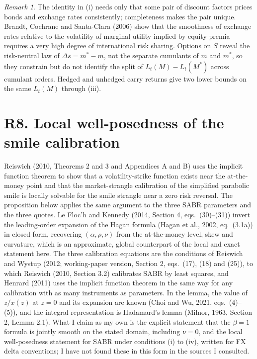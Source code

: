 \documentclass[11pt]{article}
\theoremstyle{remark}
\newtheorem{remark}[proposition]{Remark}
\begin{document}
\begin{remark}
The identity in (i) needs only that some pair of discount factors prices bonds and exchange rates consistently; completeness makes the pair unique. Brandt, Cochrane and Santa-Clara (2006) show that the smoothness of exchange rates relative to the volatility of marginal utility implied by equity premia requires a very high degree of international risk sharing. Options on $S$ reveal the risk-neutral law of $\Delta s=m^*-m$, not the separate cumulants of $m$ and $m^*$, so they constrain but do not identify the split of $L_t(M)-L_t(M^*)$ across cumulant orders. Hedged and unhedged carry returns give two lower bounds on the same $L_t(M)$ through (iii).
\end{remark}

\section*{R8. Local well-posedness of the smile calibration}

Reiswich (2010, Theorems 2 and 3 and Appendices A and B) uses the implicit function theorem to show that a volatility-strike function exists near the at-the-money point and that the market-strangle calibration of the simplified parabolic smile is locally solvable for the smile strangle near a zero risk reversal. The proposition below applies the same argument to the three SABR parameters and the three quotes. Le Floc'h and Kennedy (2014, Section 4, eqs.~(30)--(31)) invert the leading-order expansion of the Hagan formula (Hagan et al., 2002, eq.~(3.1a)) in closed form, recovering $(\alpha,\rho,\nu)$ from the at-the-money level, skew and curvature, which is an approximate, global counterpart of the local and exact statement here. The three calibration equations are the conditions of Reiswich and Wystup (2012; working-paper version, Section 2, eqs.~(17), (18) and (25)), to which Reiswich (2010, Section 3.2) calibrates SABR by least squares, and Henrard (2011) uses the implicit function theorem in the same way for any calibration with as many instruments as parameters. In the lemma, the value of $z/x(z)$ at $z=0$ and its expansion are known (Choi and Wu, 2021, eqs.~(4)--(5)), and the integral representation is Hadamard's lemma (Milnor, 1963, Section 2, Lemma 2.1). What I claim as my own is the explicit statement that the $\beta=1$ formula is jointly smooth on the stated domain, including $\nu=0$, and the local well-posedness statement for SABR under conditions (i) to (iv), written for FX delta conventions; I have not found these in this form in the sources I consulted.
\end{document}
